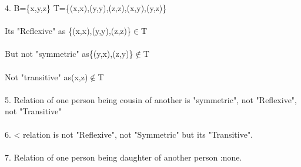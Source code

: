 \documentclass[a4paper,english,12pt]{article}
\begin{document}
4. B=\{x,y,z\}       T=\{(x,x),(y,y),(z,z),(x,y),(y,z)\}\\\\
 Its "Reflexive" as           \{(x,x),(y,y),(z,z)\}$\in$T\\\\
 But not "symmetric" as\{(y,x),(z,y)\}$\notin$T\\\\
 Not "transitive" as(x,z)$\notin$T\\\\
5. Relation of one person being cousin of    another is "symmetric", not "Reflexive", not "Transitive"\\\\
6. < relation is not "Reflexive", not "Symmetric" but its "Transitive".\\\\
7. Relation of one person being daughter of another person :none.\\\\
\end{document}
